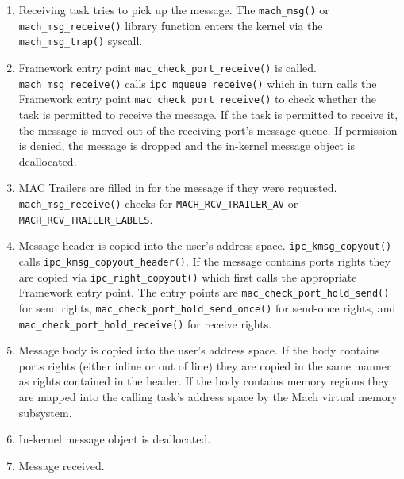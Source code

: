 \begin{enumerate}
....

\item {Receiving task tries to pick up the message.}
The {\tt mach\_msg()} or {\tt mach\_msg\_receive()} library function enters
the kernel via the {\tt mach\_msg\_trap()} syscall.

\item {Framework entry point {\tt mac\_check\_port\_receive()} is called.}
{\tt mach\_msg\_receive()} calls {\tt ipc\_mqueue\_receive()} which in turn
calls the Framework entry point {\tt mac\_check\_port\_receive()} to check
whether the task is permitted to receive the message.  If the task
is permitted to receive it, the message is moved out of the receiving
port's message queue.  If permission is denied, the message is dropped
and the in-kernel message object is deallocated.

\item {MAC Trailers are filled in for the message if they were requested.}
{\tt mach\_msg\_receive()} checks for {\tt MACH\_RCV\_TRAILER\_AV} or
{\tt MACH\_RCV\_TRAILER\_LABELS}.

\item {Message header is copied into the user's address space.}
{\tt ipc\_kmsg\_copyout()} calls {\tt ipc\_kmsg\_copyout\_header()}.
If the message contains ports rights they are copied via
{\tt ipc\_right\_copyout()} which first calls the appropriate Framework
entry point.  The entry points are {\tt mac\_check\_port\_hold\_send()}
for send rights, {\tt mac\_check\_port\_hold\_send\_once()} for send-once
rights, and {\tt mac\_check\_port\_hold\_receive()} for receive rights.

\item {Message body is copied into the user's address space.}
If the body contains ports rights (either inline or out of line)
they are copied in the same manner as rights contained in the
header.  If the body contains memory regions they are
mapped into the calling task's address space by the Mach
virtual memory subsystem.

\item {In-kernel message object is deallocated.}

\item {Message received.}

\end{enumerate}
